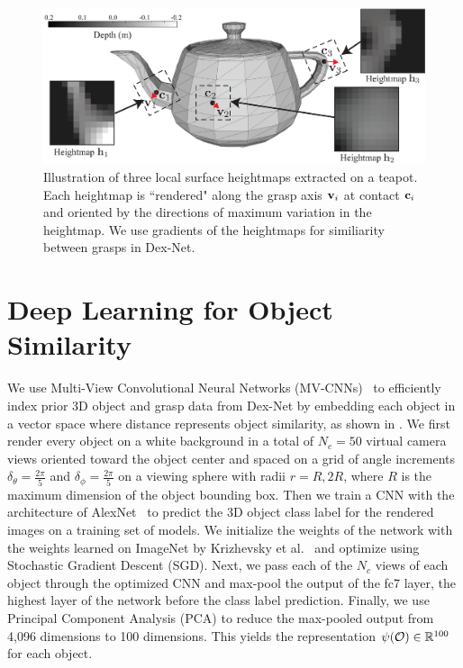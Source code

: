 \begin{figure}[t!]
\centering
\includegraphics[scale=0.30]{figures/illustrations/local_feature_model.eps}
\caption{Illustration of three local surface heightmaps extracted on a teapot. Each heightmap is ``rendered" along the grasp axis $\mathbf{v}_i$ at contact $\mathbf{c}_i$ and oriented by the directions of maximum variation in the heightmap.  We use gradients of the heightmaps for similiarity between grasps in Dex-Net.}
\vspace*{-15pt}
\end{figure}

\section{Deep Learning for Object Similarity}
We use Multi-View Convolutional Neural Networks (MV-CNNs)~\cite{su2015multi} to efficiently index prior 3D object and grasp data from Dex-Net by embedding each object in a vector space where distance represents object similarity, as shown in .
We first render every object on a white background in a total of $N_c = 50$ virtual camera views oriented toward the object center and spaced on a grid of angle increments $\delta_{\theta} = \frac{2 \pi}{5}$ and $\delta_{\phi} = \frac{2 \pi}{5}$ on a viewing sphere with radii $r = R, 2R$, where $R$ is the maximum dimension of the object bounding box.
Then we train a CNN with the architecture of AlexNet~\cite{krizhevsky2012imagenet} to predict the 3D object class label for the rendered images on a training set of models. 
We initialize the weights of the network with the weights learned on ImageNet by Krizhevsky et al.~\cite{krizhevsky2012imagenet} and optimize using Stochastic Gradient Descent (SGD). 
Next, we pass each of the $N_c$ views of each object through the optimized CNN and max-pool the output of the fc7 layer, the highest layer of the network before the class label prediction. 
Finally, we use Principal Component Analysis (PCA) to reduce the max-pooled output from 4,096 dimensions to 100 dimensions.
This yields the representation $\psi(\mathcal{O}) \in \mathbb{R}^{100}$ for each object.

